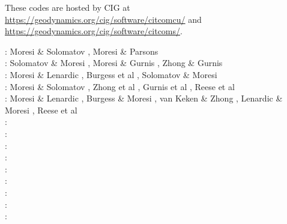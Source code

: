 \begin{itemize}
These codes are hosted by CIG at\\
\url{https://geodynamics.org/cig/software/citcomcu/} and \\
\url{https://geodynamics.org/cig/software/citcoms/}.

\begin{scriptsize}
\nineteenninetyfive: Moresi \& Solomatov \cite{moso95}, Moresi \& Parsons \cite{mopa95}\\
\nineteenninetysix: Solomatov \& Moresi \cite{somo96}, Moresi \& Gurnis \cite{mogu96}, Zhong \& Gurnis \cite{zhgu96}\\
\nineteenninetyseven: Moresi \& Lenardic \cite{mole97}, Burgess et al \cite{bugm97}, Solomatov \& Moresi \cite{somo97}\\
\nineteenninetyeight: Moresi \& Solomatov \cite{moso98}, Zhong et al \cite{zhgm98}, Gurnis et al \cite{gumm98}, Reese et al \cite{resm98}\\
\nineteenninetynine: Moresi \& Lenardic \cite{mole99}, Burgess \& Moresi \cite{bumo99}, van Keken \& Zhong \cite{vazh99},
                     Lenardic \& Moresi \cite{lemo99}, Reese et al \cite{resm99}\\
\twothousand: \cite{zhzm00}\cite{gumr00}\cite{lemm00}\cite{gumm00}\cite{somo00}\\
\twothousandone: \cite{bigu01}\cite{lemo01}\cite{zhon01}\\
\twothousandtwo: \cite{tagh02}\cite{somo02}\\
\twothousandthree: \cite{vazh03}\cite{cogu03}\cite{bigu03}\cite{lemm03}\cite{lemo03}\cite{bigs03}\cite{vesh03}\\
\twothousandfour: \cite{solo04}\cite{frmm04}\cite{lenm04}\cite{colm04}\cite{mczh04}\\
\twothousandfive: \cite{bihi05}\cite{mczh05a}\cite{mczh05b}\cite{lemj05}\cite{zhon05}\\
\twothousandsix: \cite{beck06}\cite{pibf06}\cite{tact06}\cite{besb06}\cite{coli06}\cite{frmm06}\cite{colm06}
      \cite{zhon06}\cite{keso06}\cite{rozh06}\cite{zhpy06}\\
\twothousandseven: \cite{bihi07}\cite{zhzl07}\cite{magu07}\cite{bavi07}\cite{rimb07}\cite{mofm07}\cite{cobs07}
      \cite{qums07}\cite{huda07}\cite{rozh07}\\
\twothousandeight: \cite{dihf08}\cite{gamc08}\cite{zhmt08}\cite{hole08}\cite{lejm08}\cite{lisg08}\cite{chzy08}
      \cite{beke08}\cite{beck08}\cite{slee08}\cite{lezh08}\cite{king08}\cite{ligu08}\cite{meco08}
      \cite{roni08}\cite{splg08}\cite{divf08}\cite{vavg08}\\

\end{scriptsize}
\end{itemize}

